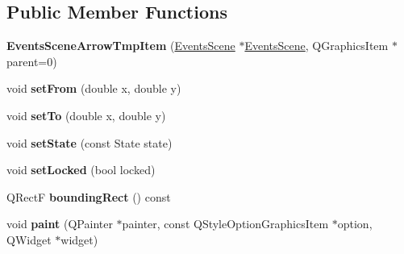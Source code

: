 \subsection*{Public Member Functions}
\begin{DoxyCompactItemize}
\item 
\hypertarget{class_events_scene_arrow_tmp_item_a1e8e7f06dbef0f552a11c71c8e11774e}{{\bfseries Events\-Scene\-Arrow\-Tmp\-Item} (\hyperlink{class_events_scene}{Events\-Scene} $\ast$\hyperlink{class_events_scene}{Events\-Scene}, Q\-Graphics\-Item $\ast$parent=0)}\label{class_events_scene_arrow_tmp_item_a1e8e7f06dbef0f552a11c71c8e11774e}

\item 
\hypertarget{class_events_scene_arrow_tmp_item_a3492eeb3e061d97f4284e0c7cb39a751}{void {\bfseries set\-From} (double x, double y)}\label{class_events_scene_arrow_tmp_item_a3492eeb3e061d97f4284e0c7cb39a751}

\item 
\hypertarget{class_events_scene_arrow_tmp_item_a32edb8779c81dbfac9424a07d7f3f85e}{void {\bfseries set\-To} (double x, double y)}\label{class_events_scene_arrow_tmp_item_a32edb8779c81dbfac9424a07d7f3f85e}

\item 
\hypertarget{class_events_scene_arrow_tmp_item_a88ae3d914762a12c444e53240874bb80}{void {\bfseries set\-State} (const State state)}\label{class_events_scene_arrow_tmp_item_a88ae3d914762a12c444e53240874bb80}

\item 
\hypertarget{class_events_scene_arrow_tmp_item_aa4d2ccd5ac1ca35059c8282be23407e7}{void {\bfseries set\-Locked} (bool locked)}\label{class_events_scene_arrow_tmp_item_aa4d2ccd5ac1ca35059c8282be23407e7}

\item 
\hypertarget{class_events_scene_arrow_tmp_item_ac03db4d0a4b3ccb08ce472106c35e98d}{Q\-Rect\-F {\bfseries bounding\-Rect} () const }\label{class_events_scene_arrow_tmp_item_ac03db4d0a4b3ccb08ce472106c35e98d}

\item 
\hypertarget{class_events_scene_arrow_tmp_item_a8b803478fb18a032de9b813899d0299c}{void {\bfseries paint} (Q\-Painter $\ast$painter, const Q\-Style\-Option\-Graphics\-Item $\ast$option, Q\-Widget $\ast$widget)}\label{class_events_scene_arrow_tmp_item_a8b803478fb18a032de9b813899d0299c}

\end{DoxyCompactItemize}
